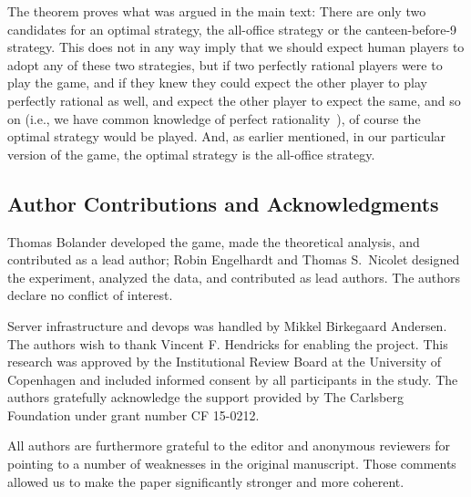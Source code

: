 \documentclass[twocolumn,a4paper,superscriptaddress,nofootinbib]{revtex4}
\begin{document}
The theorem proves what was argued in the main text: There are only two candidates for an optimal strategy, the all-office strategy or the canteen-before-9 strategy. This does not in any way imply that we should expect human players to adopt any of these two strategies, but if two perfectly rational players were to play the game, and if they knew they could expect the other player to play perfectly rational as well, and expect the other player to expect the same, and so on (i.e., we have common knowledge of perfect rationality~\cite{aumann1995backward}),
of course the optimal strategy would be played. And, as earlier mentioned, in our particular version of the game, the optimal strategy is the all-office strategy.



\if{}
\begin{acknowledgments}
\else
\section{Author Contributions and Acknowledgments}
\fi
Thomas Bolander developed the game, made the theoretical analysis, and contributed as a lead author; Robin Engelhardt and Thomas S.\ Nicolet designed the experiment, analyzed the data, and contributed as lead authors. The authors declare no conflict of interest.

Server infrastructure and devops was handled by Mikkel Birkegaard Andersen. The authors wish to thank Vincent F. Hendricks for enabling the project. This research was approved by the Institutional Review Board at the University of Copenhagen and included informed consent by all participants in the study. The authors gratefully acknowledge the support provided by The Carlsberg Foundation under grant number CF 15-0212.

All authors are furthermore grateful to the editor and anonymous reviewers for pointing to a number of weaknesses in the original manuscript. Those comments allowed us to make the paper significantly stronger and more coherent. 

\if{}
\end{acknowledgments}
\fi

\end{document}
